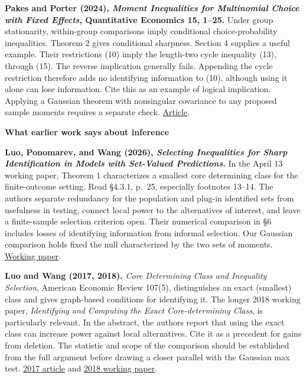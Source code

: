 \documentclass[12pt,letterpaper]{article}
\newcommand{\entry}[1]{\par\medskip{\large\bfseries #1}\par\nobreak}
\newcommand{\src}[2]{\href{#1}{#2}}
\begin{document}
\textbf{Pakes and Porter (2024), \emph{Moment Inequalities for Multinomial Choice with Fixed Effects}, Quantitative Economics 15, 1--25.}
Under group stationarity, within-group comparisons imply conditional choice-probability inequalities. Theorem 2 gives conditional sharpness. Section 4 supplies a useful example. Their restrictions (10) imply the length-two cycle inequality (13), through (15). The reverse implication generally fails. Appending the cycle restriction therefore adds no identifying information to (10), although using it alone can lose information. Cite this as an example of logical implication. Applying a Gaussian theorem with nonsingular covariance to any proposed sample moments requires a separate check. \src{https://doi.org/10.3982/QE1776}{Article}.

\newpage
{\LARGE\bfseries What earlier work says about inference}\par
\entry{The closest comparisons}
\textbf{Luo, Ponomarev, and Wang (2026), \emph{Selecting Inequalities for Sharp Identification in Models with Set-Valued Predictions}.}
In the April 13 working paper, Theorem 1 characterizes a smallest core determining class for the finite-outcome setting. Read \S4.3.1, p.~25, especially footnotes 13--14. The authors separate redundancy for the population and plug-in identified sets from usefulness in testing, connect local power to the alternatives of interest, and leave a finite-sample selection criterion open. Their numerical comparison in \S6 includes losses of identifying information from informal selection. Our Gaussian comparison holds fixed the null characterized by the two sets of moments. \src{https://wang-hai.net/file/selecting_inequalities_full.pdf}{Working paper}.

\textbf{Luo and Wang (2017, 2018).}
\emph{Core Determining Class and Inequality Selection}, American Economic Review 107(5), distinguishes an exact (smallest) class and gives graph-based conditions for identifying it. The longer 2018 working paper, \emph{Identifying and Computing the Exact Core-determining Class}, is particularly relevant. In the abstract, the authors report that using the exact class can increase power against local alternatives. Cite it as a precedent for gains from deletion. The statistic and scope of the comparison should be established from the full argument before drawing a closer parallel with the Gaussian max test. \src{https://doi.org/10.1257/aer.p20171041}{2017 article} and \src{https://ink.library.smu.edu.sg/sis_research/4337/}{2018 working paper}.
\end{document}
